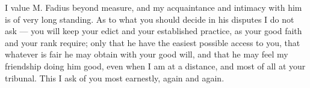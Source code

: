 

I value M. Fadius beyond measure, and my acquaintance and intimacy with him is of very long standing. As to what you should decide in his disputes I do not ask --- you will keep your edict and your established practice, as your good faith and your rank require; only that he have the easiest possible access to you, that whatever is fair he may obtain with your good will, and that he may feel my friendship doing him good, even when I am at a distance, and most of all at your tribunal. This I ask of you most earnestly, again and again.
